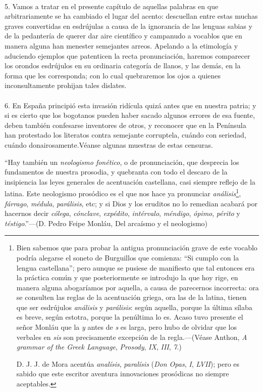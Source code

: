 \documentclass{book}
\begin{document}
\normalsize

\paragraph{} 5. Vamos a tratar en el presente capítulo de aquellas palabras en que arbitrariamente se ha 
cambiado el lugar del acento: descuellan entre estas muchas graves convertidas en esdrújulas a causa de 
la ignorancia de las lenguas sabias y de la pedantería de querer dar aire científico y campanudo a 
vocablos que en manera alguna han menester semejantes arreos. Apelando a la etimología y aduciendo 
ejemplos que patenticen la recta pronunciación, haremos comparecer los orondos esdrújulos en su ordinaria 
categoría de llanos, y las demás, en la forma que les corresponda; con lo cual quebraremos los ojos a 
quienes inconsultamente prohijan tales dislates.

\paragraph{} 6. En España principió esta invasión ridícula quizá antes que en nuestra patria; y si es 
cierto que los bogotanos pueden haber sacado algunos errores de esa fuente, deben también confesarse 
inventores de otros, y reconocer que en la Península han protestado los literatos contra semejante 
corruptela, cuándo con seriedad, cuándo donairosamente.Véanse algunas muestras de estas censuras.

``Hay también un \emph{neologismo fonético}, o de pronunciación, que desprecia los fundamentos de nuestra 
prosodia, y quebranta con todo el descaro de la insipiencia las leyes generales de acentuación 
castellana, casi siempre reflejo de la latina. Este neologismo prosódico es el que nos hace ya pronunciar 
\emph{análisis}\footnote{Bien sabemos que para probar la antigua pronunciación grave de este vocablo 
podría alegarse el soneto de Burguillos que comienza: ``Si cumplo con la lengua castellana''; pero aunque 
se pusiese de manifiesto que tal entonces era la práctica común y que posteriormente se introdujo la que 
hoy rige, en manera alguna abogaríamos por aquella, a causa de parecernos incorrecta: ora se consulten 
las reglas de la acentuación griega, ora las de la latina, tienen que ser esdrújulos \emph{análisis} y 
\emph{parálisis}: según aquella, porque la última sílaba es breve, según estotra, porque la penúltima lo 
es. Acaso tuvo presente el señor Monláu que la \emph{y} antes de \emph{s} es larga, pero hubo de olvidar 
que los verbales en \emph{sis} son precisamente excepción de la regla.---(Véase Anthon, \emph{A grammar 
of the Greek Language}, \emph{Prosody}, \emph{IX}, \emph{III}, \emph{7}.)

D. J. J. de Mora acentúa \emph{analísis}, \emph{paralísis} (\emph{Don Opas}, \emph{I}, \emph{LVII}); pero 
es sabido que este escritor aventura innovaciones prosódicas no siempre aceptables.}, \emph{fárrago}, 
\emph{médula}, \emph{parálisis}, etc; y si Dios y los eruditos no lo remedian acabará por hacernos decir 
\emph{cólega}, \emph{cónclave}, \emph{expédito}, \emph{intérvalo}, \emph{méndigo}, \emph{ópimo}, 
\emph{périto} y \emph{téstigo}.''---(D. Pedro Feipe Monláu, Del arcaísmo y el neologismo)
\end{document}
